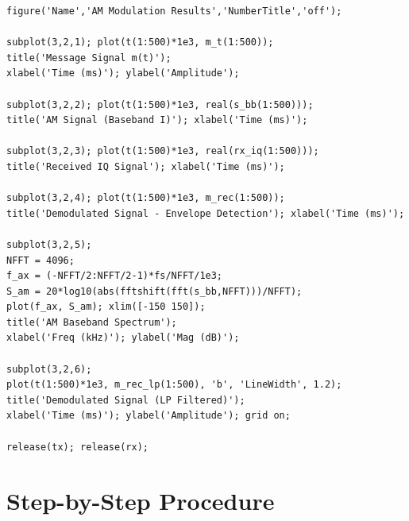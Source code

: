 \documentclass[12pt,a4paper]{article}
\begin{document}
\begin{lstlisting}[style=matlab, caption={AM Modulation and Demodulation with PlutoSDR}, label={lst:amcode}]
%% === PLOTS ===
figure('Name','AM Modulation Results','NumberTitle','off');

subplot(3,2,1); plot(t(1:500)*1e3, m_t(1:500));
title('Message Signal m(t)');
xlabel('Time (ms)'); ylabel('Amplitude');

subplot(3,2,2); plot(t(1:500)*1e3, real(s_bb(1:500)));
title('AM Signal (Baseband I)'); xlabel('Time (ms)');

subplot(3,2,3); plot(t(1:500)*1e3, real(rx_iq(1:500)));
title('Received IQ Signal'); xlabel('Time (ms)');

subplot(3,2,4); plot(t(1:500)*1e3, m_rec(1:500));
title('Demodulated Signal - Envelope Detection'); xlabel('Time (ms)');

subplot(3,2,5);
NFFT = 4096;
f_ax = (-NFFT/2:NFFT/2-1)*fs/NFFT/1e3;
S_am = 20*log10(abs(fftshift(fft(s_bb,NFFT)))/NFFT);
plot(f_ax, S_am); xlim([-150 150]);
title('AM Baseband Spectrum');
xlabel('Freq (kHz)'); ylabel('Mag (dB)');

subplot(3,2,6);
plot(t(1:500)*1e3, m_rec_lp(1:500), 'b', 'LineWidth', 1.2);
title('Demodulated Signal (LP Filtered)');
xlabel('Time (ms)'); ylabel('Amplitude'); grid on;

release(tx); release(rx);
\end{lstlisting}

\section{Step-by-Step Procedure}
\end{document}
